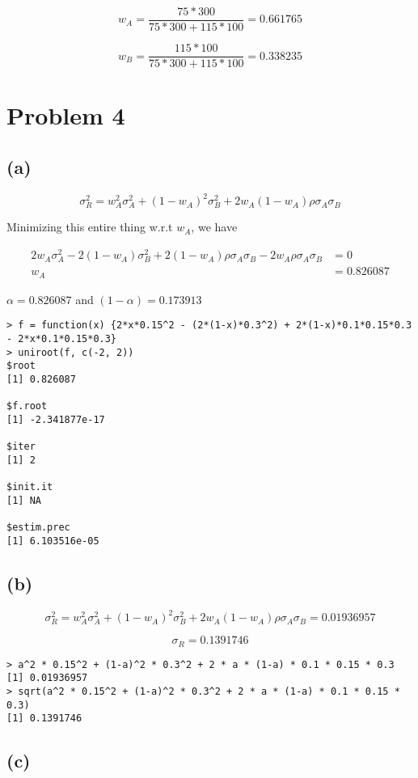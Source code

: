 \documentclass[11pt]{scrartcl}
\begin{document}
\[w_A = \frac{75 * 300}{75*300 + 115 * 100} = 0.661765\]

\[w_B = \frac{115*100}{75*300+115*100} = 0.338235\]

\section*{Problem 4}

\subsection*{(a)}

\[\sigma_R^2 = w_A^2 \sigma_A^2 + (1-w_A)^2\sigma_B^2 + 2w_A(1-w_A)\rho\sigma_A\sigma_B\]

Minimizing this entire thing w.r.t $w_A$, we have

\begin{align*}
2w_A\sigma_A^2 - 2(1-w_A)\sigma_B^2 + 2(1-w_A)\rho\sigma_A\sigma_B - 2w_A\rho\sigma_A\sigma_B &= 0 \\
w_A &= 0.826087
\end{align*}

$\alpha = 0.826087$ and $(1-\alpha) = 0.173913$

\begin{lstlisting}
> f = function(x) {2*x*0.15^2 - (2*(1-x)*0.3^2) + 2*(1-x)*0.1*0.15*0.3 - 2*x*0.1*0.15*0.3}
> uniroot(f, c(-2, 2))
$root
[1] 0.826087

$f.root
[1] -2.341877e-17

$iter
[1] 2

$init.it
[1] NA

$estim.prec
[1] 6.103516e-05
\end{lstlisting}

\subsection*{(b)}

\[\sigma_R^2 = w_A^2 \sigma_A^2 + (1-w_A)^2\sigma_B^2 + 2w_A(1-w_A)\rho\sigma_A\sigma_B = 0.01936957\]

\[\sigma_R = 0.1391746\]

\begin{lstlisting}
> a^2 * 0.15^2 + (1-a)^2 * 0.3^2 + 2 * a * (1-a) * 0.1 * 0.15 * 0.3
[1] 0.01936957
> sqrt(a^2 * 0.15^2 + (1-a)^2 * 0.3^2 + 2 * a * (1-a) * 0.1 * 0.15 * 0.3)
[1] 0.1391746
\end{lstlisting}

\subsection*{(c)}
\end{document}
